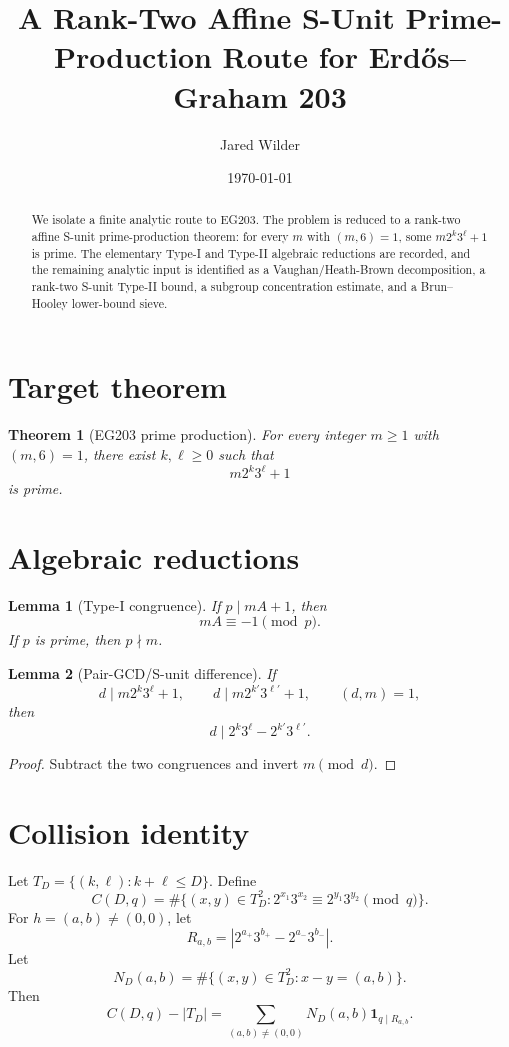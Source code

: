 \documentclass[11pt]{article}
\title{A Rank-Two Affine S-Unit Prime-Production Route for Erdős--Graham 203}
\author{Jared Wilder}
\date{\today}
\newtheorem{theorem}{Theorem}
\newtheorem{lemma}{Lemma}
\begin{document}
\maketitle

\begin{abstract}
We isolate a finite analytic route to EG203.  The problem is reduced to a
rank-two affine S-unit prime-production theorem: for every \(m\) with
\((m,6)=1\), some \(m2^k3^\ell+1\) is prime.  The elementary Type-I and
Type-II algebraic reductions are recorded, and the remaining analytic input is
identified as a Vaughan/Heath-Brown decomposition, a rank-two S-unit
Type-II bound, a subgroup concentration estimate, and a Brun--Hooley
lower-bound sieve.
\end{abstract}

\section{Target theorem}

\begin{theorem}[EG203 prime production]
For every integer \(m\ge 1\) with \((m,6)=1\), there exist \(k,\ell\ge 0\)
such that
\[
  m2^k3^\ell+1
\]
is prime.
\end{theorem}

\section{Algebraic reductions}

\begin{lemma}[Type-I congruence]
If \(p\mid mA+1\), then
\[
  mA\equiv -1\pmod p.
\]
If \(p\) is prime, then \(p\nmid m\).
\end{lemma}

\begin{lemma}[Pair-GCD/S-unit difference]
If
\[
d\mid m2^k3^\ell+1,\qquad d\mid m2^{k'}3^{\ell'}+1,\qquad (d,m)=1,
\]
then
\[
d\mid 2^k3^\ell-2^{k'}3^{\ell'}.
\]
\end{lemma}

\begin{proof}
Subtract the two congruences and invert \(m\pmod d\).
\end{proof}

\section{Collision identity}

Let \(T_D=\{(k,\ell):k+\ell\le D\}\). Define
\[
C(D,q)=\#\{(x,y)\in T_D^2:2^{x_1}3^{x_2}\equiv2^{y_1}3^{y_2}\pmod q\}.
\]
For \(h=(a,b)\ne(0,0)\), let
\[
R_{a,b}=\left|2^{a_+}3^{b_+}-2^{a_-}3^{b_-}\right|.
\]
Let
\[
N_D(a,b)=\#\{(x,y)\in T_D^2:x-y=(a,b)\}.
\]
Then
\[
C(D,q)-|T_D|
=
\sum_{(a,b)\ne(0,0)}N_D(a,b)\mathbf 1_{q\mid R_{a,b}}.
\]
\end{document}
